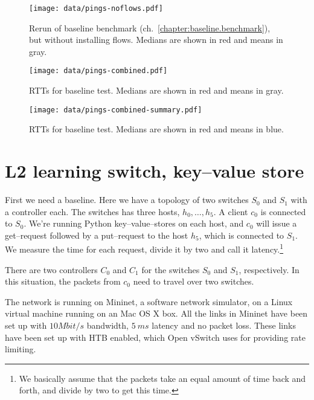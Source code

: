 \begin{figure}[H]
  \centering
  \texttt{[image: data/pings-noflows.pdf]}
  \caption{Rerun of baseline benchmark
    (ch.~\ref{chapter:baseline.benchmark}), but without installing flows.
  Medians are shown in red and means in gray.}
  \label{figure:baseline.noflows.plots}
\end{figure}

\begin{figure}[H]
  \centering
  \texttt{[image: data/pings-combined.pdf]}
  \caption{RTTs for baseline test.  Medians are shown in red and means in gray.}
  \label{figure:baseline.combined.plot}
\end{figure}

\begin{figure}[H]
  \centering
  \texttt{[image: data/pings-combined-summary.pdf]}
  \caption{RTTs for baseline test.  Medians are shown in red and means in blue.}
  \label{figure:baseline.combined.summary.plot}
\end{figure}

\section{L2 learning switch, key--value store}
\label{chapter:benchmark.l2.kv.noflows}

First we need a baseline.  Here we have a topology of two switches $S_0$ and
$S_1$ with a controller each.  The switches has three hosts, $h_0, \dots, h_5$.
A client $c_0$ is connected to $S_0$. We're running Python
key--value--stores on each host, and $c_0$ will issue a get--request
followed by a put--request to the host $h_5$, which is connected to $S_1$.
We measure the time for each request, divide it
by two and call it latency.\footnote{We basically assume that the packets
take an equal amount of time back and forth, and divide by two to get this
time.}

There are two controllers $C_0$ and $C_1$ for the switches $S_0$ and $S_1$,
respectively.  In this situation, the packets from $c_0$ need to travel
over two switches.

The network is running on Mininet, a software network simulator, on a Linux
virtual machine running on an Mac OS X box.  All the links in Mininet have
been set up with $10 Mbit/s$ bandwidth, $5~ms$ latency and no packet
loss.  These links have been set up with \ac{HTB}
\cite{devera2002hierarchical} enabled, which Open vSwitch
 uses for providing rate limiting.

